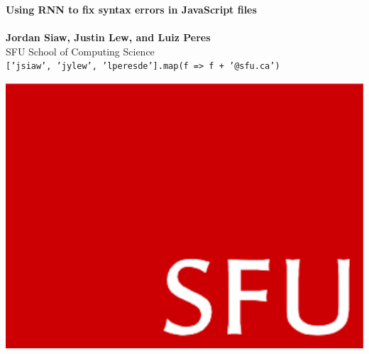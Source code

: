 \documentclass[a0,portrait]{a0poster}
\begin{document}


\begin{minipage}[b]{0.75\linewidth}
\veryHuge \color{NavyBlue} \textbf{Using RNN to fix syntax errors in JavaScript files} \color{Black}\\ %
\Huge \textit{}\\[2cm] %
\huge \textbf{Jordan Siaw, Justin Lew, and Luiz Peres}\\[0.5cm] %
\huge SFU School of Computing Science\\[0.4cm] %
\Large \texttt{[\color{NavyBlue}'jsiaw'\color{Black}, \color{NavyBlue}'jylew'\color{Black}, \color{NavyBlue}'lperesde']\color{Black}.\color[rgb]{0.435, 0.258, 0.756}map\color{Black}(f \color[rgb]{0.843, 0.227, 0.286}=> \color{Black}f \color[rgb]{0.843, 0.227, 0.286}+ \color{NavyBlue}'@sfu.ca'\color{Black})}\\
\end{minipage}
%
\begin{minipage}[b]{0.25\linewidth}
\includegraphics[width=20cm]{logo.png}\\
\end{minipage}
\end{document}

